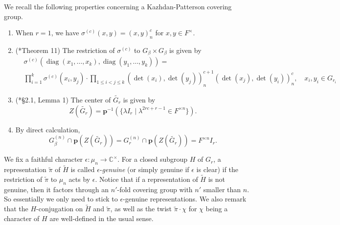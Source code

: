 \documentclass{amsart}
\numberwithin{equation}{section}
\newcommand{\mrdet}{\operatorname{det}}
\newcommand{\mrdiag}{\operatorname{diag}}
\newcommand{\mrgcd}{\operatorname{gcd}}
\newcommand{\mbc}{\mathbb{C}}
\newcommand{\mbf}{\mathbb{F}}
\newcommand{\bs}[1]{\boldsymbol{#1}}
\newcommand{\wt}[1]{\widetilde{#1}}
\begin{document}
	We recall the following properties concerning a Kazhdan-Patterson covering group.
	\begin{enumerate}
		\item When $r=1$, we have $\sigma^{(c)}(x,y)=(x,y)^{c}_{n}$ for $x,y\in F^{\times}$.
		
		\item (\cite{banks1999block}*{Theorem 11}) The restriction of $\sigma^{(c)}$ to $G_{\beta}\times G_{\beta}$ is given by
		\begin{align}
			&\sigma^{(c)}(\mrdiag(x_{1},\dots,x_{k}),\mrdiag(y_{1},\dots, y_{k}))= \nonumber \\
			&\prod_{i=1}^{k}\sigma^{(c)}(x_{i},y_{j})\cdot\prod_{1\leq i<j\leq k}(\mrdet(x_{i}),\mrdet(y_{j}))_{n}^{c+1}(\mrdet(x_{j}),\mrdet(y_{i}))_{n}^{c},\quad x_{i},y_{i}\in G_{r_{i}} \label{eqBLS}
		\end{align}
		\item (\cite{chinta2013metaplectic}*{\S 2.1, Lemma 1}) The center of $\wt{G_{r}}$ is given by
		\begin{equation}\label{eqZwtGr}
			Z(\wt{G_{r}})=\bs{p}^{-1}(\{\lambda I_{r}\mid \lambda^{2rc+r-1}\in F^{\times n}\}).
		\end{equation}
		
		\item By direct calculation, \begin{equation}\label{eqZwtGrintersection}
			G_{\beta}^{(n)}\cap \bs{p}(Z(\wt{G_{r}}))=G_{r}^{(n)}\cap \bs{p}(Z(\wt{G_{r}}))=F^{\times n} I_{r}.
		\end{equation}
		
		
	\end{enumerate}
	
	We fix a faithful character $\epsilon:\mu_{n}\rightarrow \mbc^{\times}$. For a closed subgroup $H$ of $G_{r}$, a representation $\wt{\pi}$ of $\wt{H}$ is called $\epsilon$-\emph{genuine} (or simply genuine if $\epsilon$ is clear) if the restriction of $\wt{\pi}$ to $\mu_{n}$ acts by $\epsilon$. Notice that if a representation of $\wt{H}$ is not genuine, then it factors through an $n'$-fold covering group with $n'$ smaller than $n$. So essentially we only need to stick to $\epsilon$-genuine representations. We also remark that the $H$-conjugation on $\wt{H}$ and $\wt{\pi}$, as well as the twist $\wt{\pi}\cdot\chi$ for $\chi$ being a character of $H$ are well-defined in the usual sense.
	
\end{document}
